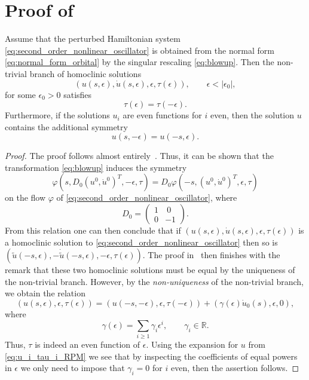\section{Proof of \texorpdfstring{}{Proposition 3.1}}
\label{sec:proof:symmetry_proposition}
\begin{proposition}
    Assume that the perturbed Hamiltonian system
    \cref{eq:second_order_nonlinear_oscillator} is obtained from the normal form
    \cref{eq:normal_form_orbital} by the singular rescaling
    \cref{eq:blowup}. Then the non-trivial branch of homoclinic solutions 
    \[
        (u(s,\epsilon), \dot u(s, \epsilon), \epsilon, \tau(\epsilon)),
            \qquad \epsilon<|\epsilon_0|,
    \]
    for some $\epsilon_0>0$ satisfies
    \begin{equation}
        \tau(\epsilon) = \tau(-\epsilon).
    \end{equation}
    Furthermore, if the solutions $u_i$ are even functions for $i$ even, then 
    the solution $u$ contains the additional symmetry
    \[
        u(s,-\epsilon) = u(-s,\epsilon)
    .\] 
\end{proposition}
\begin{proof}
    The proof follows almost entirely~\cite[Proposition 4.2]{Beyn_1994}. Thus,
    it can be shown that the transformation \cref{eq:blowup} induces the
    symmetry
    \[
        \varphi(s, D_0 (u^0, \dot u^0)^T, -\epsilon, \tau)
        =
        D_0 \varphi(-s, (u^0, \dot u^0)^T, \epsilon, \tau)
    \] 
    on the flow $\varphi$ of \cref{eq:second_order_nonlinear_oscillator}, where 
    \[
        D_0 = \begin{pmatrix} 1 & ~0 \\  0 & -1 \end{pmatrix}.
    \] 
    From this relation one can then conclude that if $(u(s,\epsilon), \dot
    u(s,\epsilon), \epsilon, \tau(\epsilon))$ is a homoclinic solution to
    \cref{eq:second_order_nonlinear_oscillator} then so is $(\tilde
    u(-s,\epsilon), -\dot{\tilde{u}}(-s,\epsilon), -\epsilon, \tau(\epsilon))$.
    The proof in~\cite{Beyn_1994} then finishes with the remark that these two
    homoclinic solutions must be equal by the uniqueness of the non-trivial
    branch. However, by the \emph{non-uniqueness} of the non-trivial branch, we
    obtain the relation
    \[
        (u(s,\epsilon), \epsilon, \tau(\epsilon))
        =
        (u(-s,-\epsilon), \epsilon, \tau(-\epsilon))
        +
        (\gamma(\epsilon) \dot u_0(s), \epsilon, 0),
    \]
    where
    \begin{equation}
        \label{eq:gamma}
        \gamma(\epsilon) = \sum_{i\geq 1} \gamma_i \epsilon^i,
        \qquad
        \gamma_i \in \mathbb R.
    \end{equation}
    Thus, $\tau$ is indeed an even function of $\epsilon$. Using the expansion
    for $u$ from \cref{eq:u_i_tau_i_RPM} we see that by inspecting the
    coefficients of equal powers in $\epsilon$ we only need to impose that
    $\gamma_i=0$ for $i$ even, then the assertion follows.
\end{proof}

